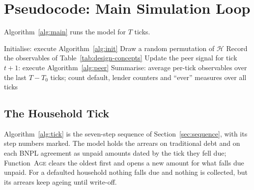 \section{Pseudocode: Main Simulation Loop}
\label{app:pseudo-main}

Algorithm~\ref{alg:main} runs the model for $T$ ticks.

\begin{algorithm}[!htbp]
\caption{Main simulation}
\label{alg:main}
\begin{algorithmic}
\State Initialise: execute Algorithm~\ref{alg:init}
    \State Draw a random permutation of $\mathcal{H}$
    \State Record the observables of Table~\ref{tab:design-concepts}
    \State Update the peer signal for tick $t+1$: execute Algorithm~\ref{alg:peer}
\EndFor
\State Summarise: average per-tick observables over the last $T - T_0$ ticks; count default, lender counters and ``ever'' measures over all ticks
\end{algorithmic}
\end{algorithm}

\subsection{The Household Tick}\label{app:main-tick}

Algorithm~\ref{alg:tick} is the seven-step sequence of Section~\ref{sec:sequence}, with its step
numbers marked. The model holds the arrears on traditional debt and on each \ac{BNPL} agreement as
unpaid amounts dated by the tick they fell due; Function~\textsc{Age} clears the oldest first and
opens a new amount for what falls due unpaid. For a defaulted household nothing falls due and
nothing is collected, but its arrears keep ageing until write-off.


